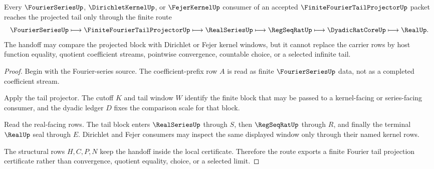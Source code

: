 \begin{theorem}
\label{thm:finite-fourier-tail-projector-fourier-series-handoff}
Every $\FourierSeriesUp$, $\DirichletKernelUp$, or $\FejerKernelUp$ consumer of an accepted $\FiniteFourierTailProjectorUp$ packet reaches the projected tail only through the finite route
$$
\FourierSeriesUp \longmapsto \FiniteFourierTailProjectorUp \longmapsto \RealSeriesUp \longmapsto \RegSeqRatUp \longmapsto \DyadicRatCoreUp \longmapsto \RealUp .
$$
The handoff may compare the projected block with Dirichlet or Fejer kernel windows, but it cannot replace the carrier rows by host function equality, quotient coefficient streams, pointwise convergence, countable choice, or a selected infinite tail.
\end{theorem}
\begin{proof}
Begin with the Fourier-series source. The coefficient-prefix row $A$ is read as finite $\FourierSeriesUp$ data, not as a completed coefficient stream.

Apply the tail projector. The cutoff $K$ and tail window $W$ identify the finite block that may be passed to a kernel-facing or series-facing consumer, and the dyadic ledger $D$ fixes the comparison scale for that block.

Read the real-facing rows. The tail block enters $\RealSeriesUp$ through $S$, then $\RegSeqRatUp$ through $R$, and finally the terminal $\RealUp$ seal through $E$. Dirichlet and Fejer consumers may inspect the same displayed window only through their named kernel rows.

The structural rows $H,C,P,N$ keep the handoff inside the local certificate. Therefore the route exports a finite Fourier tail projection certificate rather than convergence, quotient equality, choice, or a selected limit.
\end{proof}



